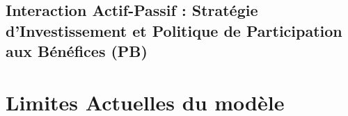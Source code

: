     \subsection{Interaction Actif-Passif : Stratégie d'Investissement et Politique de Participation aux Bénéfices (PB)}

\section{Limites Actuelles du modèle}






